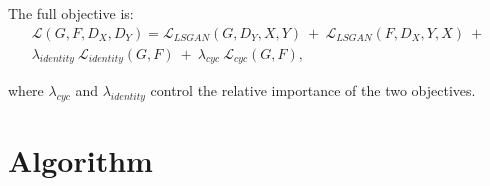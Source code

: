 The full objective is:
\begin{equation}\label{FullObjective}
\begin{aligned}
    \mathcal{L}(G, F, D_X, D_Y) =  \mathcal{L}_{LSGAN}(G, D_Y, X, Y)\ +\ \mathcal{L}_{LSGAN}(F, D_X, Y, X)\ +\ \\
    \lambda_{identity}\ \mathcal{L}_{identity}(G, F)\ +\ \lambda_{cyc}\ \mathcal{L}_{cyc}(G, F),
\end{aligned}
\end{equation}
    
where $\lambda_{cyc}$ and $\lambda_{identity}$ control the relative importance of the two objectives.




\section{Algorithm}\label{CycleGANAlgorithm}


